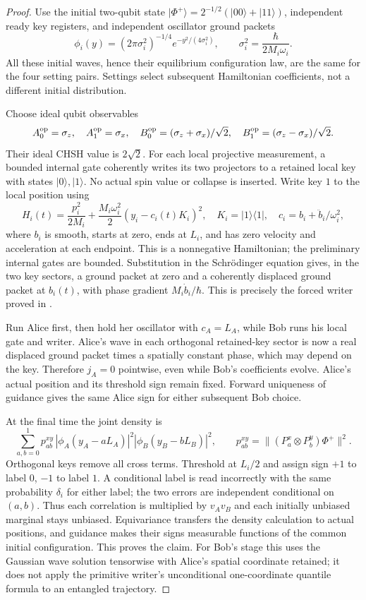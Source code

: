 \documentclass[11pt,a4paper]{article}
\theoremstyle{definition}
\theoremstyle{remark}\newtheorem{remark}[theorem]{Remark}
\newcommand{\ket}[1]{\lvert#1\rangle}
\newcommand{\bra}[1]{\langle#1\rvert}
\begin{document}
\begin{proof}
Use the initial two-qubit state
$\ket{\Phi^+}=2^{-1/2}(\ket{00}+\ket{11})$, independent ready key
registers, and independent oscillator ground packets
\[
 \phi_i(y)=(2\pi\sigma_i^2)^{-1/4}e^{-y^2/(4\sigma_i^2)},\qquad
 \sigma_i^2=\frac{\hbar}{2M_i\omega_i}.
\]
All these initial waves, hence their equilibrium configuration law, are
the same for the four setting pairs. Settings select subsequent
Hamiltonian coefficients, not a different initial distribution.

Choose ideal qubit observables
\[
 A_0^{\rm op}=\sigma_z,\quad A_1^{\rm op}=\sigma_x,\quad
 B_0^{\rm op}=(\sigma_z+\sigma_x)/\sqrt2,\quad
 B_1^{\rm op}=(\sigma_z-\sigma_x)/\sqrt2.
\]
Their ideal CHSH value is $2\sqrt2$. For each local projective
measurement, a bounded internal gate coherently writes its two
projectors to a retained local key with states $\ket0,\ket1$. No actual
spin value or collapse is inserted. Write key $1$ to the local position
using
\[
 H_i(t)=\frac{p_i^2}{2M_i}
       +\frac{M_i\omega_i^2}{2}(y_i-c_i(t)K_i)^2,
 \quad K_i=\ket1\bra1,
 \quad c_i=b_i+\ddot b_i/\omega_i^2,
\]
where $b_i$ is smooth, starts at zero, ends at $L_i$, and has zero
velocity and acceleration at each endpoint. This is a nonnegative
Hamiltonian; the preliminary internal gates are bounded. Substitution
in the Schr\"odinger equation gives, in the two key sectors, a ground
packet at zero and a coherently displaced ground packet at $b_i(t)$,
with phase gradient $M_i\dot b_i/\hbar$. This is precisely the forced
writer proved in \cite[\texttt{mc:prop:writer}]{RM}.

Run Alice first, then hold her oscillator with
$c_A=L_A$, while Bob runs his local gate and writer. Alice's wave
in each orthogonal retained-key sector is now a real displaced
ground packet times a spatially constant phase, which may depend on
the key. Therefore
$j_A=0$ pointwise, even while Bob's coefficients evolve. Alice's actual
position and its threshold sign remain fixed. Forward uniqueness of
guidance gives the same Alice sign for either subsequent Bob choice.

At the final time the joint density is
\[
 \sum_{a,b=0}^1 p_{ab}^{xy}\,
  |\phi_A(y_A-aL_A)|^2|\phi_B(y_B-bL_B)|^2,
 \qquad
 p_{ab}^{xy}=\|(P_a^x\otimes P_b^y)\Phi^+\|^2.
\]
Orthogonal keys remove all cross terms. Threshold at $L_i/2$ and assign
sign $+1$ to label $0$, $-1$ to label $1$. A conditional label is read
incorrectly with the same probability $\delta_i$ for either label;
the two errors are independent conditional on $(a,b)$. Thus each
correlation is multiplied by $v_Av_B$ and each initially unbiased
marginal stays unbiased. Equivariance transfers the density calculation
to actual positions, and guidance makes their signs measurable
functions of the common initial configuration. This proves the claim.
For Bob's stage this uses the Gaussian wave solution tensorwise with
Alice's spatial coordinate retained; it does not apply the primitive
writer's unconditional one-coordinate quantile formula to an entangled
trajectory.
\end{proof}
\end{document}

